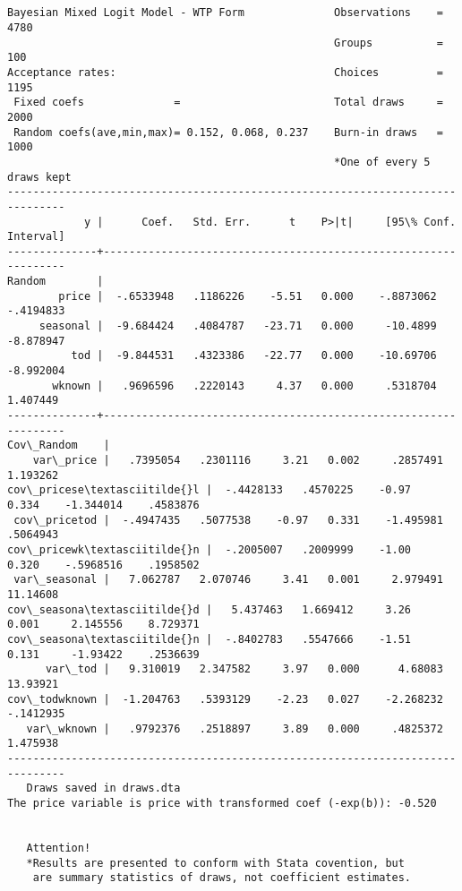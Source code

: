 \documentclass[11pt]{article}
\begin{document}
    \begin{Verbatim}[commandchars=\\\{\}]


Bayesian Mixed Logit Model - WTP Form              Observations    =      4780
                                                   Groups          =       100
Acceptance rates:                                  Choices         =      1195
 Fixed coefs              =                        Total draws     =      2000
 Random coefs(ave,min,max)= 0.152, 0.068, 0.237    Burn-in draws   =      1000
                                                   *One of every 5 draws kept
-------------------------------------------------------------------------------
            y |      Coef.   Std. Err.      t    P>|t|     [95\% Conf. Interval]
--------------+----------------------------------------------------------------
Random        |
        price |  -.6533948   .1186226    -5.51   0.000    -.8873062   -.4194833
     seasonal |  -9.684424   .4084787   -23.71   0.000     -10.4899   -8.878947
          tod |  -9.844531   .4323386   -22.77   0.000    -10.69706   -8.992004
       wknown |   .9696596   .2220143     4.37   0.000     .5318704    1.407449
--------------+----------------------------------------------------------------
Cov\_Random    |
    var\_price |   .7395054   .2301116     3.21   0.002     .2857491    1.193262
cov\_pricese\textasciitilde{}l |  -.4428133   .4570225    -0.97   0.334    -1.344014    .4583876
 cov\_pricetod |  -.4947435   .5077538    -0.97   0.331    -1.495981    .5064943
cov\_pricewk\textasciitilde{}n |  -.2005007   .2009999    -1.00   0.320    -.5968516    .1958502
 var\_seasonal |   7.062787   2.070746     3.41   0.001     2.979491    11.14608
cov\_seasona\textasciitilde{}d |   5.437463   1.669412     3.26   0.001     2.145556    8.729371
cov\_seasona\textasciitilde{}n |  -.8402783   .5547666    -1.51   0.131     -1.93422    .2536639
      var\_tod |   9.310019   2.347582     3.97   0.000      4.68083    13.93921
cov\_todwknown |  -1.204763   .5393129    -2.23   0.027    -2.268232   -.1412935
   var\_wknown |   .9792376   .2518897     3.89   0.000     .4825372    1.475938
-------------------------------------------------------------------------------
   Draws saved in draws.dta
The price variable is price with transformed coef (-exp(b)): -0.520


   Attention!
   *Results are presented to conform with Stata covention, but
    are summary statistics of draws, not coefficient estimates.
    \end{Verbatim}
\end{document}
